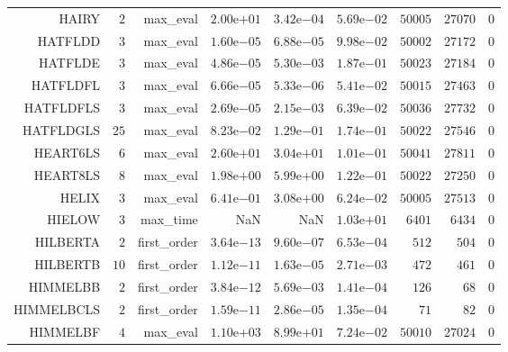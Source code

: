 \begin{longtable}{rrrrrrrrr}
HAIRY & \(     2\) & max\_eval & \( 2.00\)e\(+01\) & \( 3.42\)e\(-04\) & \( 5.69\)e\(-02\) & \( 50005\) & \( 27070\) & \(     0\) \\
HATFLDD & \(     3\) & max\_eval & \( 1.60\)e\(-05\) & \( 6.88\)e\(-05\) & \( 9.98\)e\(-02\) & \( 50002\) & \( 27172\) & \(     0\) \\
HATFLDE & \(     3\) & max\_eval & \( 4.86\)e\(-05\) & \( 5.30\)e\(-03\) & \( 1.87\)e\(-01\) & \( 50023\) & \( 27184\) & \(     0\) \\
HATFLDFL & \(     3\) & max\_eval & \( 6.66\)e\(-05\) & \( 5.33\)e\(-06\) & \( 5.41\)e\(-02\) & \( 50015\) & \( 27463\) & \(     0\) \\
HATFLDFLS & \(     3\) & max\_eval & \( 2.69\)e\(-05\) & \( 2.15\)e\(-03\) & \( 6.39\)e\(-02\) & \( 50036\) & \( 27732\) & \(     0\) \\
HATFLDGLS & \(    25\) & max\_eval & \( 8.23\)e\(-02\) & \( 1.29\)e\(-01\) & \( 1.74\)e\(-01\) & \( 50022\) & \( 27546\) & \(     0\) \\
HEART6LS & \(     6\) & max\_eval & \( 2.60\)e\(+01\) & \( 3.04\)e\(+01\) & \( 1.01\)e\(-01\) & \( 50041\) & \( 27811\) & \(     0\) \\
HEART8LS & \(     8\) & max\_eval & \( 1.98\)e\(+00\) & \( 5.99\)e\(+00\) & \( 1.22\)e\(-01\) & \( 50022\) & \( 27250\) & \(     0\) \\
HELIX & \(     3\) & max\_eval & \( 6.41\)e\(-01\) & \( 3.08\)e\(+00\) & \( 6.24\)e\(-02\) & \( 50005\) & \( 27513\) & \(     0\) \\
HIELOW & \(     3\) & max\_time &       NaN &       NaN & \( 1.03\)e\(+01\) & \(  6401\) & \(  6434\) & \(     0\) \\
HILBERTA & \(     2\) & first\_order & \( 3.64\)e\(-13\) & \( 9.60\)e\(-07\) & \( 6.53\)e\(-04\) & \(   512\) & \(   504\) & \(     0\) \\
HILBERTB & \(    10\) & first\_order & \( 1.12\)e\(-11\) & \( 1.63\)e\(-05\) & \( 2.71\)e\(-03\) & \(   472\) & \(   461\) & \(     0\) \\
HIMMELBB & \(     2\) & first\_order & \( 3.84\)e\(-12\) & \( 5.69\)e\(-03\) & \( 1.41\)e\(-04\) & \(   126\) & \(    68\) & \(     0\) \\
HIMMELBCLS & \(     2\) & first\_order & \( 1.59\)e\(-11\) & \( 2.86\)e\(-05\) & \( 1.35\)e\(-04\) & \(    71\) & \(    82\) & \(     0\) \\
HIMMELBF & \(     4\) & max\_eval & \( 1.10\)e\(+03\) & \( 8.99\)e\(+01\) & \( 7.24\)e\(-02\) & \( 50010\) & \( 27024\) & \(     0\) \\

\end{longtable}
